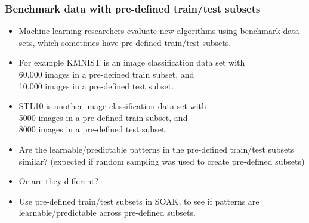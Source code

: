 \documentclass[t]{beamer}
\begin{document}
\begin{frame}
  \frametitle{Benchmark data with pre-defined train/test subsets}
  \begin{itemize}
  \item Machine learning researchers evaluate new algorithms using
    benchmark data sets, which sometimes have pre-defined train/test
    subsets.
  \item For example KMNIST is an image classification data set with \\
    60,000 images in a pre-defined train subset, and \\
    10,000 images in a pre-defined test subset.
  \item STL10 is another image classification data set with \\
    5000 images in a pre-defined train subset, and \\
    8000 images in a pre-defined test subset.
  \item Are the learnable/predictable patterns in the pre-defined train/test subsets
    similar? (expected if random sampling was used to create pre-defined subsets)
  \item Or are they different?
  \item Use pre-defined train/test subsets in SOAK, to see if patterns are learnable/predictable across pre-defined subsets.
  \end{itemize}
\end{frame}
\end{document}
